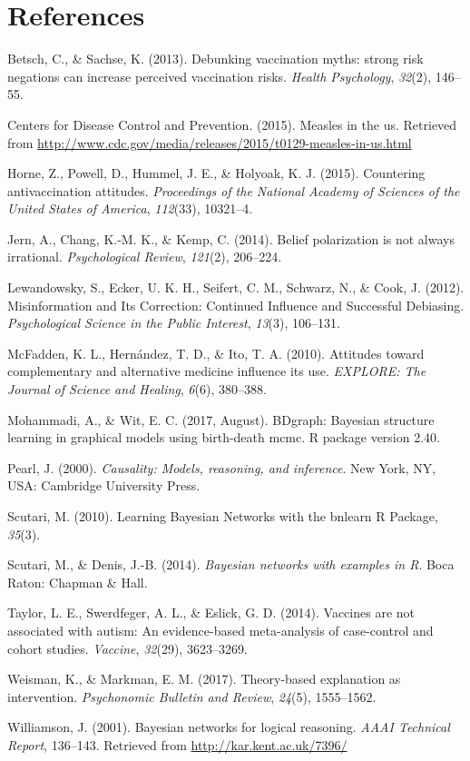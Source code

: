 \documentclass[10pt, letterpaper]{article}
\begin{document}
\section{References}\label{references}

\setlength{\parindent}{-0.1in} \setlength{\leftskip}{0.125in} \noindent

\hypertarget{refs}{}
\hypertarget{ref-Betsch2013}{}
Betsch, C., \& Sachse, K. (2013). Debunking vaccination myths: strong
risk negations can increase perceived vaccination risks. \emph{Health
Psychology}, \emph{32}(2), 146--55.

\hypertarget{ref-CDC2015}{}
Centers for Disease Control and Prevention. (2015). Measles in the us.
Retrieved from
\url{http://www.cdc.gov/media/releases/2015/t0129-measles-in-us.html}

\hypertarget{ref-Horne2015}{}
Horne, Z., Powell, D., Hummel, J. E., \& Holyoak, K. J. (2015).
Countering antivaccination attitudes. \emph{Proceedings of the National
Academy of Sciences of the United States of America}, \emph{112}(33),
10321--4.

\hypertarget{ref-Jern2014}{}
Jern, A., Chang, K.-M. K., \& Kemp, C. (2014). Belief polarization is
not always irrational. \emph{Psychological Review}, \emph{121}(2),
206--224.

\hypertarget{ref-Lewandowsky2012}{}
Lewandowsky, S., Ecker, U. K. H., Seifert, C. M., Schwarz, N., \& Cook,
J. (2012). Misinformation and Its Correction: Continued Influence and
Successful Debiasing. \emph{Psychological Science in the Public
Interest}, \emph{13}(3), 106--131.

\hypertarget{ref-McFadden2010}{}
McFadden, K. L., Hernández, T. D., \& Ito, T. A. (2010). Attitudes
toward complementary and alternative medicine influence its use.
\emph{EXPLORE: The Journal of Science and Healing}, \emph{6}(6),
380--388.

\hypertarget{ref-Mohammadi2017}{}
Mohammadi, A., \& Wit, E. C. (2017, August). BDgraph: Bayesian structure
learning in graphical models using birth-death mcmc. R package version
2.40.

\hypertarget{ref-Pearl2000}{}
Pearl, J. (2000). \emph{Causality: Models, reasoning, and inference}.
New York, NY, USA: Cambridge University Press.

\hypertarget{ref-Scutari2010}{}
Scutari, M. (2010). Learning Bayesian Networks with the bnlearn R
Package, \emph{35}(3).

\hypertarget{ref-Scutari2014}{}
Scutari, M., \& Denis, J.-B. (2014). \emph{Bayesian networks with
examples in R}. Boca Raton: Chapman \& Hall.

\hypertarget{ref-Taylor2014}{}
Taylor, L. E., Swerdfeger, A. L., \& Eslick, G. D. (2014). Vaccines are
not associated with autism: An evidence-based meta-analysis of
case-control and cohort studies. \emph{Vaccine}, \emph{32}(29),
3623--3269.

\hypertarget{ref-Weisman2017}{}
Weisman, K., \& Markman, E. M. (2017). Theory-based explanation as
intervention. \emph{Psychonomic Bulletin and Review}, \emph{24}(5),
1555--1562.

\hypertarget{ref-Williamson2001}{}
Williamson, J. (2001). Bayesian networks for logical reasoning.
\emph{AAAI Technical Report}, 136--143. Retrieved from
\url{http://kar.kent.ac.uk/7396/}
\end{document}

